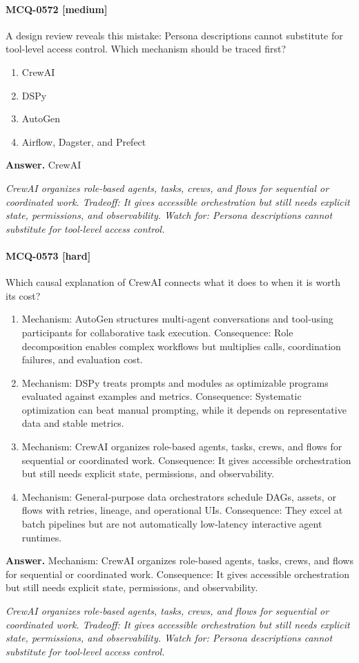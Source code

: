 \paragraph{MCQ-0572 [medium]} A design review reveals this mistake: Persona descriptions cannot substitute for tool-level access control. Which mechanism should be traced first?
\begin{enumerate}[label=\Alph*.]
\item CrewAI
\item DSPy
\item AutoGen
\item Airflow, Dagster, and Prefect
\end{enumerate}
\noindent\textbf{Answer.} CrewAI
\par\textit{CrewAI organizes role-based agents, tasks, crews, and flows for sequential or coordinated work. Tradeoff: It gives accessible orchestration but still needs explicit state, permissions, and observability. Watch for: Persona descriptions cannot substitute for tool-level access control.}
\paragraph{MCQ-0573 [hard]} Which causal explanation of CrewAI connects what it does to when it is worth its cost?
\begin{enumerate}[label=\Alph*.]
\item Mechanism: AutoGen structures multi-agent conversations and tool-using participants for collaborative task execution. Consequence: Role decomposition enables complex workflows but multiplies calls, coordination failures, and evaluation cost.
\item Mechanism: DSPy treats prompts and modules as optimizable programs evaluated against examples and metrics. Consequence: Systematic optimization can beat manual prompting, while it depends on representative data and stable metrics.
\item Mechanism: CrewAI organizes role-based agents, tasks, crews, and flows for sequential or coordinated work. Consequence: It gives accessible orchestration but still needs explicit state, permissions, and observability.
\item Mechanism: General-purpose data orchestrators schedule DAGs, assets, or flows with retries, lineage, and operational UIs. Consequence: They excel at batch pipelines but are not automatically low-latency interactive agent runtimes.
\end{enumerate}
\noindent\textbf{Answer.} Mechanism: CrewAI organizes role-based agents, tasks, crews, and flows for sequential or coordinated work. Consequence: It gives accessible orchestration but still needs explicit state, permissions, and observability.
\par\textit{CrewAI organizes role-based agents, tasks, crews, and flows for sequential or coordinated work. Tradeoff: It gives accessible orchestration but still needs explicit state, permissions, and observability. Watch for: Persona descriptions cannot substitute for tool-level access control.}
